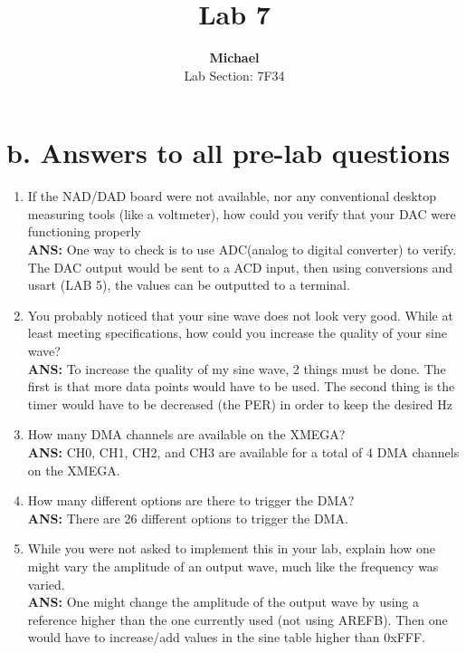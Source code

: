 \documentclass[11pt]{article}
\theoremstyle{plain}
\theoremstyle{definition}
\begin{document}
\captionsetup[figure]{labelfont=bf} 

\title{Lab 7}
\author{\textbf{Michael}\\Lab Section: 7F34}
\maketitle
%
%
\section*{b. Answers to all pre-lab questions}



\begin{enumerate}[label={\arabic*)},font={\color{red}\bfseries}]
	\item If the NAD/DAD board were not available, nor any conventional desktop measuring tools (like a voltmeter), how could you verify that your DAC were functioning properly
	\\[0.8ex]
	\textbf{ANS: } One way to check is to use ADC(analog to digital converter) to verify.  The DAC output would be sent to a ACD input, then using conversions and usart (LAB 5), the values can be outputted to a terminal. 
	\item You probably noticed that your sine wave does not look very good. While at least meeting specifications, how could you increase the quality of your sine wave?
	\\[0.8ex]
	\textbf{ANS: } To increase the quality of my sine wave, 2 things must be done. The first is that more data points would have to be used. The second thing is the timer would have to be decreased (the PER) in order to keep the desired Hz
	\item How many DMA channels are available on the XMEGA?
	\\[0.8ex]
	\textbf{ANS: } CH0, CH1, CH2, and CH3 are available for a total of 4 DMA channels on the XMEGA. 
	\item How many different options are there to trigger the DMA?
	\\[0.8ex]
	\textbf{ANS: } There are 26 different options to trigger the DMA.
	\item While you were not asked to implement this in your lab, explain how one might vary the amplitude of an output wave, much like the frequency was varied. 
	\\[0.8ex]
	\textbf{ANS: } One might change the amplitude of the output wave by using a reference higher than the one currently used (not using AREFB). Then one would have to increase/add values in the sine table higher than 0xFFF.
\end{enumerate}
%
%
\end{document}
